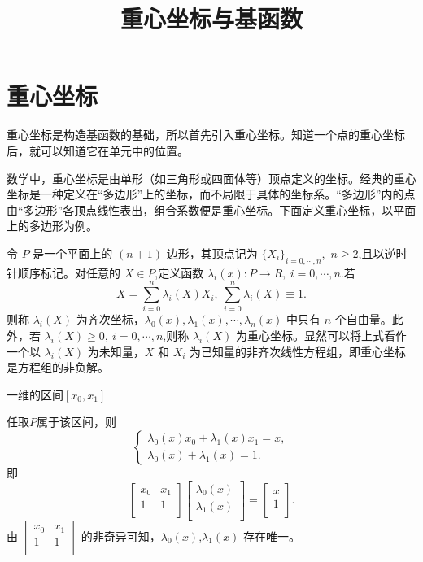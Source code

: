 \documentclass[12pt,a4paper]{article}
\title{重心坐标与基函数}
\author{}
\date{\chntoday}
\begin{document}
\maketitle

\section{重心坐标}
重心坐标是构造基函数的基础，所以首先引入重心坐标。知道一个点的重心坐标后，就可以知道它在单元中的位置。

数学中，重心坐标是由单形（如三角形或四面体等）顶点定义的坐标。经典的重心坐标是一种定义在“多边形”上的坐标，而不局限于具体的坐标系。“多边形”内的点由“多边形”各顶点线性表出，组合系数便是重心坐标。下面定义重心坐标，以平面上的多边形为例。

令 $P$ 是一个平面上的 $(n+1)$ 边形，其顶点记为 $\lbrace X_i\rbrace_{i=0,\cdots,n}$,~$n\ge 2$,且以逆时针顺序标记。对任意的 $X\in P$,定义函数 $\lambda _i(x):P\longrightarrow R,~i=0,\cdots,n$.若
$$
X=\sum_{i=0}^n \lambda _i(X)X_i,~\sum_{i=0}^n\lambda _i(X)\equiv 1.
$$
则称 $\lambda _i(X)$ 为齐次坐标，$\lambda _0(x),\lambda _1(x),\cdots,\lambda _n(x)$ 中只有 $n$ 个自由量。此外，若 $\lambda _i(X)\ge 0,~i=0,\cdots,n$,则称 $\lambda _i(X)$ 为重心坐标。显然可以将上式看作一个以 $\lambda _i(X)$ 为未知量，$X$ 和 $X_i$ 为已知量的非齐次线性方程组，即重心坐标是方程组的非负解。

一维的区间$[x_0,x_1]$

任取$P$属于该区间，则
$$
\begin{cases}
\lambda _0(x)x_0+\lambda _1(x)x_1=x,\\
\lambda _0(x)+\lambda _1(x)=1.
\end{cases}
$$
即
$$
\begin{bmatrix}
x_0 & x_1 \\
1 & 1 \\
\end{bmatrix}
\begin{bmatrix}
\lambda _0(x)\\
\lambda _1(x)\\
\end{bmatrix}=\begin{bmatrix}
x\\
1\\
\end{bmatrix}.
$$
由 $\begin{bmatrix}
x_0 & x_1 \\
1 & 1 \\
\end{bmatrix}$ 的非奇异可知，$\lambda _0(x)$,$\lambda _1(x)$ 存在唯一。
\end{document}
